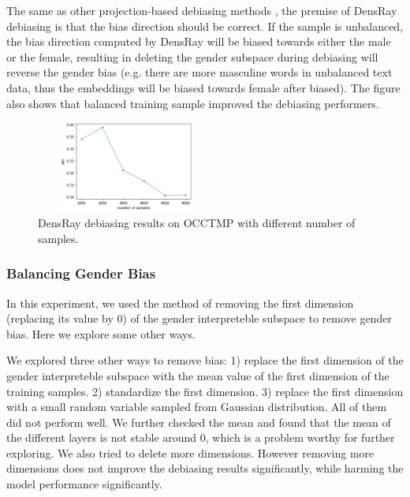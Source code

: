 The same as other projection-based debiasing methods \citep{bolukbasi2016man,zhao2019gender,dev2019attenuating, karve2019conceptor}, the premise of DensRay debiasing is that the bias direction should be correct. If the sample is unbalanced, the bias direction computed by DensRay will be biased towards either the male or the female, resulting in deleting the gender subspace during debiasing will reverse the gender bias (e.g. there are more masculine words in unbalanced text data, thus the embeddings will be biased towards female after biased). The figure also shows that balanced training sample improved the debiasing performers. 
\begin{figure}[ht]
    \centering
    \includegraphics[width=6cm,height=3cm]{samples}
    \caption{DensRay debiasing results on OCCTMP with different number of samples.}
\end{figure}

\subsubsection{Balancing Gender Bias}
In this experiment, we used the method of removing the first dimension (replacing its value by $0$) of the gender interpreteble subspace to remove gender bias. Here we explore some other ways.

We explored three other ways to remove bias: 1) replace the first dimension of the gender interpreteble subspace with the mean value of the first dimension of the training samples. 2) standardize the first dimension. 3) replace the first dimension with a small random variable sampled from Gaussian distribution. All of them did not perform well. We further checked the mean and found that the mean of the different layers is not stable around 0, which is a problem worthy for further exploring. We also tried to delete more dimensions. However removing more dimensions does not improve the debiasing results significantly, while harming the model performance significantly.


